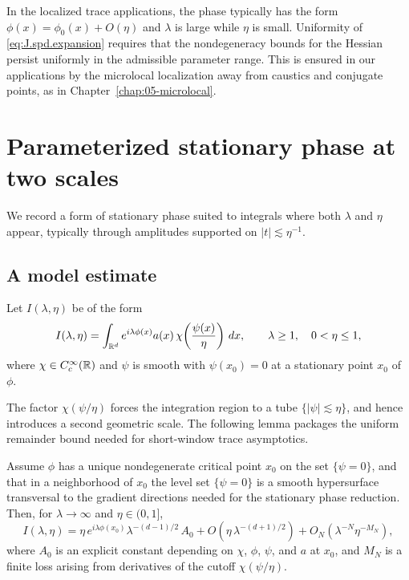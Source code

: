 \begin{remark}
\label{rem:J.spd.uniform}
In the localized trace applications, the phase typically has the form
$\phi(x)=\phi_0(x)+O(\eta)$ and $\lambda$ is large while $\eta$ is small.
Uniformity of \eqref{eq:J.spd.expansion} requires that the nondegeneracy bounds for the Hessian persist uniformly in
the admissible parameter range.  This is ensured in our applications by the microlocal localization away from caustics
and conjugate points, as in Chapter~\ref{chap:05-microlocal}.
\end{remark}

\section{Parameterized stationary phase at two scales}
\label{sec:J.two.scale}

We record a form of stationary phase suited to integrals where both $\lambda$ and $\eta$ appear, typically through
amplitudes supported on $|t|\lesssim \eta^{-1}$.

\subsection{A model estimate}
\label{subsec:J.model}

Let $I(\lambda,\eta)$ be of the form
\begin{equation}\label{eq:J.model.integral}
I(\lambda,\eta)
=
\int_{\mathbb{R}^d} e^{i\lambda\phi(x)} a(x)\,\chi\!\left(\frac{\psi(x)}{\eta}\right)\,dx,
\qquad
\lambda\ge 1,\quad 0<\eta\le 1,
\end{equation}
where $\chi\in C_c^\infty(\mathbb{R})$ and $\psi$ is smooth with $\psi(x_0)=0$ at a stationary point $x_0$ of $\phi$.

The factor $\chi(\psi/\eta)$ forces the integration region to a tube $\{|\psi|\lesssim \eta\}$, and hence introduces a
second geometric scale.  The following lemma packages the uniform remainder bound needed for short-window trace
asymptotics.

\begin{lemma}
\label{lem:J.twoscale}
Assume $\phi$ has a unique nondegenerate critical point $x_0$ on the set $\{\psi=0\}$, and that in a neighborhood of
$x_0$ the level set $\{\psi=0\}$ is a smooth hypersurface transversal to the gradient directions needed for the
stationary phase reduction.  Then, for $\lambda\to\infty$ and $\eta\in(0,1]$,
\begin{equation}\label{eq:J.twoscale.bound}
I(\lambda,\eta)
=
\eta\,e^{i\lambda\phi(x_0)}\lambda^{-(d-1)/2}\,A_0
+
O\!\left(\eta\,\lambda^{-(d+1)/2}\right)
+
O_N\!\left(\lambda^{-N}\eta^{-M_N}\right),
\end{equation}
where $A_0$ is an explicit constant depending on $\chi$, $\phi$, $\psi$, and $a$ at $x_0$, and $M_N$ is a finite loss
arising from derivatives of the cutoff $\chi(\psi/\eta)$.
\end{lemma}

